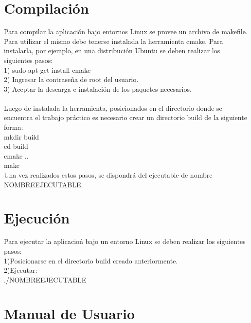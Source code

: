 \documentclass[11pt]{article}
\begin{document}
\section{Compilaci\'on}
  Para compilar la aplicaci\'on bajo entornos Linux se provee un archivo de makefile.
  Para utilizar el mismo debe tenerse instalada la herramienta cmake. Para instalarla, por ejemplo, en una distribuci\'on Ubuntu se deben 
realizar los siguientes pasos: \\

1) sudo apt-get install cmake \\
2) Ingresar la contrase\~na de root del usuario. \\
3) Aceptar la descarga e instalaci\'on de los paquetes necesarios. \\ \\

Luego de instalada la herramienta, posicionados en el directorio donde se encuentra el trabajo pr\'actico es necesario crear un directorio build
de la siguiente forma: \\
mkdir build \\
cd build \\
cmake .. \\
make \\

Una vez realizados estos pasos, se dispondr\'a del ejecutable de nombre NOMBREEJECUTABLE.

\section{Ejecuci\'on}

Para ejecutar la aplicacio\'n bajo un entorno Linux se deben realizar los siguientes pasos: \\
1)Posicionarse en el directorio build creado anteriormente. \\
2)Ejecutar: \\
./NOMBREEJECUTABLE 


\section{Manual de Usuario}
\end{document}
